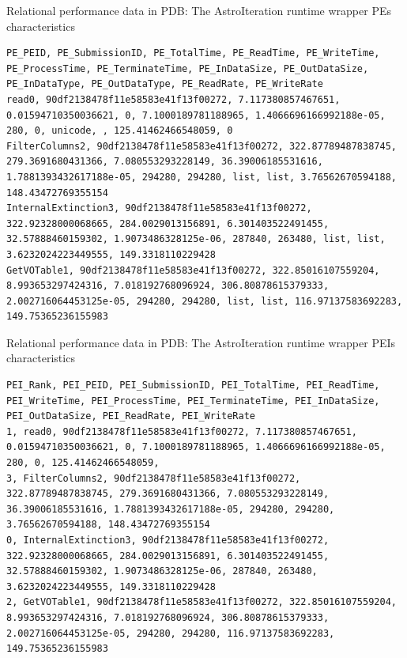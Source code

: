 \documentclass[10pt,twoside,openright,logo]{report}
\begin{document}
\begin{listing}
\caption{Relational performance data in PDB: The AstroIteration runtime wrapper PEs characteristics}
\label{code:astroi-pe}
\begin{verbatim}
PE_PEID, PE_SubmissionID, PE_TotalTime, PE_ReadTime, PE_WriteTime, PE_ProcessTime, PE_TerminateTime, PE_InDataSize, PE_OutDataSize, PE_InDataType, PE_OutDataType, PE_ReadRate, PE_WriteRate
read0, 90df2138478f11e58583e41f13f00272, 7.117380857467651, 0.01594710350036621, 0, 7.1000189781188965, 1.4066696166992188e-05, 280, 0, unicode, , 125.41462466548059, 0
FilterColumns2, 90df2138478f11e58583e41f13f00272, 322.87789487838745, 279.3691680431366, 7.080553293228149, 36.39006185531616, 1.7881393432617188e-05, 294280, 294280, list, list, 3.76562670594188, 148.43472769355154
InternalExtinction3, 90df2138478f11e58583e41f13f00272, 322.92328000068665, 284.0029013156891, 6.301403522491455, 32.57888460159302, 1.9073486328125e-06, 287840, 263480, list, list, 3.6232024223449555, 149.3318110229428
GetVOTable1, 90df2138478f11e58583e41f13f00272, 322.85016107559204, 8.993653297424316, 7.018192768096924, 306.80878615379333, 2.002716064453125e-05, 294280, 294280, list, list, 116.97137583692283, 149.75365236155983
\end{verbatim}
\end{listing}

\begin{listing}
\caption{Relational performance data in PDB: The AstroIteration runtime wrapper PEIs characteristics}
\label{code:astroi-pei}
\begin{verbatim}
PEI_Rank, PEI_PEID, PEI_SubmissionID, PEI_TotalTime, PEI_ReadTime, PEI_WriteTime, PEI_ProcessTime, PEI_TerminateTime, PEI_InDataSize, PEI_OutDataSize, PEI_ReadRate, PEI_WriteRate
1, read0, 90df2138478f11e58583e41f13f00272, 7.117380857467651, 0.01594710350036621, 0, 7.1000189781188965, 1.4066696166992188e-05, 280, 0, 125.41462466548059,
3, FilterColumns2, 90df2138478f11e58583e41f13f00272, 322.87789487838745, 279.3691680431366, 7.080553293228149, 36.39006185531616, 1.7881393432617188e-05, 294280, 294280, 3.76562670594188, 148.43472769355154
0, InternalExtinction3, 90df2138478f11e58583e41f13f00272, 322.92328000068665, 284.0029013156891, 6.301403522491455, 32.57888460159302, 1.9073486328125e-06, 287840, 263480, 3.6232024223449555, 149.3318110229428
2, GetVOTable1, 90df2138478f11e58583e41f13f00272, 322.85016107559204, 8.993653297424316, 7.018192768096924, 306.80878615379333, 2.002716064453125e-05, 294280, 294280, 116.97137583692283, 149.75365236155983
\end{verbatim}
\end{listing}
\end{document}
